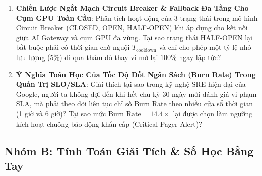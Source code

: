 \begin{enumerate}[label=\textbf{A\arabic*.}]
  \item \textbf{Chiến Lược Ngắt Mạch Circuit Breaker \& Fallback Đa Tầng Cho Cụm GPU Toàn Cầu}: Phân tích hoạt động của 3 trạng thái trong mô hình Circuit Breaker (CLOSED, OPEN, HALF-OPEN) khi áp dụng cho kết nối giữa AI Gateway và cụm GPU đa vùng. Tại sao trạng thái HALF-OPEN lại bắt buộc phải có thời gian chờ nguội $T_{\text{cooldown}}$ và chỉ cho phép một tỷ lệ nhỏ lưu lượng ($5\%$) đi qua thăm dò thay vì mở lại $100\%$ ngay lập tức?
  \item \textbf{Ý Nghĩa Toán Học Của Tốc Độ Đốt Ngân Sách (Burn Rate) Trong Quản Trị SLO/SLA}: Giải thích tại sao trong kỹ nghệ SRE hiện đại của Google, người ta không đợi đến khi hết chu kỳ 30 ngày mới đánh giá vi phạm SLA, mà phải theo dõi liên tục chỉ số Burn Rate theo nhiều cửa sổ thời gian (1 giờ và 6 giờ)? Tại sao mức $\text{Burn Rate} = 14.4\times$ lại được chọn làm ngưỡng kích hoạt chuông báo động khẩn cấp (Critical Pager Alert)?
\end{enumerate}

\subsection{Nhóm B: Tính Toán Giải Tích \& Số Học Bằng Tay}


